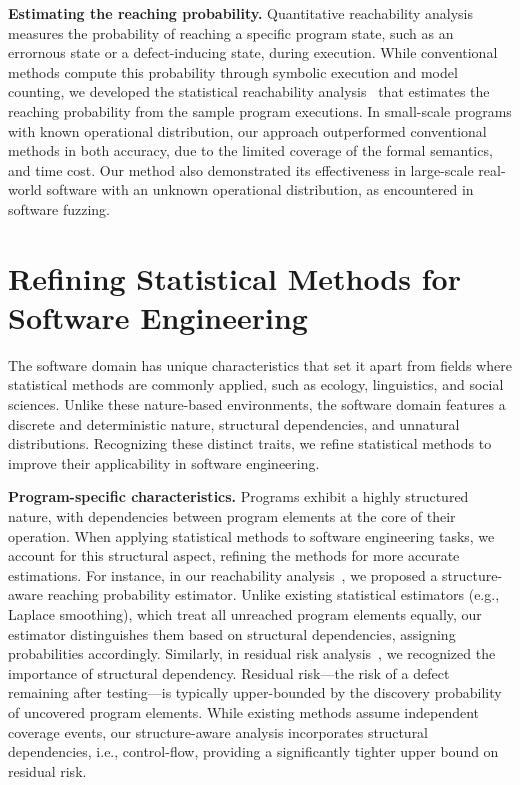 \documentclass{article}
\begin{document}
\vspace{0.5em}
\noindent\textbf{Estimating the reaching probability.} Quantitative reachability analysis measures the probability of reaching a specific program state, such as an errornous state or a defect-inducing state, during execution. While conventional methods compute this probability through symbolic execution and model counting, we developed the statistical reachability analysis~\cite{leeStatisticalReachabilityAnalysis2023} that estimates the reaching probability from the sample program executions. In small-scale programs with known operational distribution, our approach outperformed conventional methods in both accuracy, due to the limited coverage of the formal semantics, and time cost. Our method also demonstrated its effectiveness in large-scale real-world software with an unknown operational distribution, as encountered in software fuzzing.

\section{Refining Statistical Methods for Software Engineering}
\label{sec:refine}

The software domain has unique characteristics that set it apart from fields where statistical methods are commonly applied, such as ecology, linguistics, and social sciences. Unlike these nature-based environments, the software domain features a discrete and deterministic nature, structural dependencies, and unnatural distributions. Recognizing these distinct traits, we refine statistical methods to improve their applicability in software engineering.

\vspace{0.5em}
\noindent\textbf{Program-specific characteristics.}
Programs exhibit a highly structured nature, with dependencies between program elements at the core of their operation. When applying statistical methods to software engineering tasks, we account for this structural aspect, refining the methods for more accurate estimations. For instance, in our reachability analysis~\cite{leeStatisticalReachabilityAnalysis2023}, we proposed a structure-aware reaching probability estimator. Unlike existing statistical estimators (e.g., Laplace smoothing), which treat all unreached program elements equally, our estimator distinguishes them based on structural dependencies, assigning probabilities accordingly. Similarly, in residual risk analysis~\cite{leeStructureawareResidualRisk2025}, we recognized the importance of structural dependency. Residual risk—the risk of a defect remaining after testing—is typically upper-bounded by the discovery probability of uncovered program elements. While existing methods assume independent coverage events, our structure-aware analysis incorporates structural dependencies, i.e., control-flow, providing a significantly tighter upper bound on residual risk.
\end{document}
